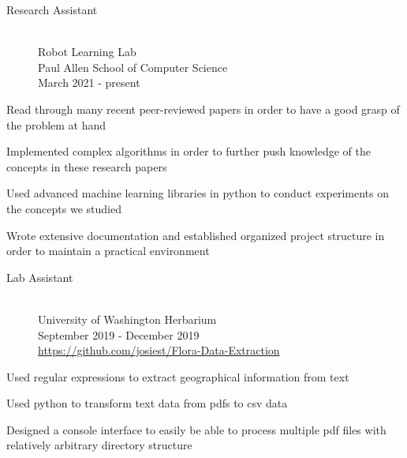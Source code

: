 \documentclass[10pt]{article}
\newenvironment{itemize*}
{\begin{itemize}[leftmargin=*]
    \setlength{\parskip}{0.5pt}}
{\end{itemize}}
\begin{document}
\begin{paracol}{2}
\begin{description}
\item[Research Assistant] \hfill \\
    Robot Learning Lab \\
    Paul Allen School of Computer Science \\
    March 2021 - present
\end{description}
\begin{itemize*}
\item Read through many recent peer-reviewed papers in order to have a good
      grasp of the problem at hand
\item Implemented complex algorithms in order to further push knowledge of the
      concepts in these research papers
\item Used advanced machine learning libraries in python to conduct experiments
      on the concepts we studied
\item Wrote extensive documentation and established organized project structure
      in order to maintain a practical environment
\end{itemize*}

\begin{description}
\item[Lab Assistant] \hfill \\
    University of Washington Herbarium\\
    September 2019 - December 2019\\
    \url{https://github.com/josiest/Flora-Data-Extraction}
\end{description}
\begin{itemize*}
\item Used regular expressions to extract geographical information from text
\item Used python to transform text data from pdfs to csv data
\item Designed a console interface to easily be able to process multiple pdf
      files with relatively arbitrary directory structure
\end{itemize*}

\end{paracol}
\end{document}

